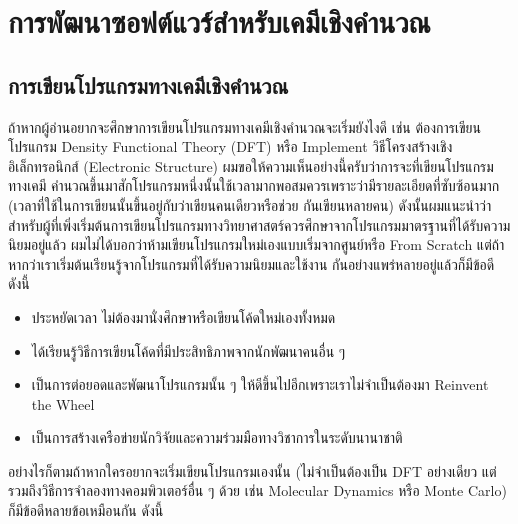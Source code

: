 

\chapter{การพัฒนาซอฟต์แวร์สำหรับเคมีเชิงคำนวณ}
\label{ch:software_dev}

\section{การเขียนโปรแกรมทางเคมีเชิงคำนวณ}

ถ้าหากผู้อ่านอยากจะศึกษาการเขียนโปรแกรมทางเคมีเชิงคำนวณจะเริ่มยังไงดี เช่น ต้องการเขียนโปรแกรม Density Functional Theory (DFT) 
หรือ Implement วิธีโครงสร้างเชิงอิเล็กทรอนิกส์ (Electronic Structure) ผมขอให้ความเห็นอย่างนี้ครับว่าการจะที่เขียนโปรแกรมทางเคมี%
คำนวณขึ้นมาสักโปรแกรมหนึ่งนั้นใช้เวลามากพอสมควรเพราะว่ามีรายละเอียดที่ซับซ้อนมาก (เวลาที่ใช้ในการเขียนนั้นขึ้นอยู่กับว่าเขียนคนเดียวหรือช่วย%
กันเขียนหลายคน) ดังนั้นผมแนะนำว่าสำหรับผู้ที่เพิ่งเริ่มต้นการเขียนโปรแกรมทางวิทยาศาสตร์ควรศึกษาจากโปรแกรมมาตรฐานที่ได้รับความนิยมอยู่แล้ว 
ผมไม่ได้บอกว่าห้ามเขียนโปรแกรมใหม่เองแบบเริ่มจากศูนย์หรือ From Scratch แต่ถ้าหากว่าเราเริ่มต้นเรียนรู้จากโปรแกรมที่ได้รับความนิยมและใช้งาน%
กันอย่างแพร่หลายอยู่แล้วก็มีข้อดีดังนี้ 

\begin{itemize}
    \item ประหยัดเวลา ไม่ต้องมานั่งศึกษาหรือเขียนโค้ดใหม่เองทั้งหมด
    
    \item ได้เรียนรู้วิธีการเขียนโค้ดที่มีประสิทธิภาพจากนักพัฒนาคนอื่น ๆ 
    
    \item เป็นการต่อยอดและพัฒนาโปรแกรมนั้น ๆ ให้ดีขึ้นไปอีกเพราะเราไม่จำเป็นต้องมา Reinvent the Wheel 
    
    \item เป็นการสร้างเครือข่ายนักวิจัยและความร่วมมือทางวิชาการในระดับนานาชาติ 
\end{itemize}

\noindent อย่างไรก็ตามถ้าหากใครอยากจะเริ่มเขียนโปรแกรมเองนั้น (ไม่จำเป็นต้องเป็น DFT อย่างเดียว แต่รวมถึงวิธีการจำลองทางคอมพิวเตอร์อื่น ๆ 
ด้วย เช่น Molecular Dynamics หรือ Monte Carlo) ก็มีข้อดีหลายข้อเหมือนกัน ดังนี้ 

